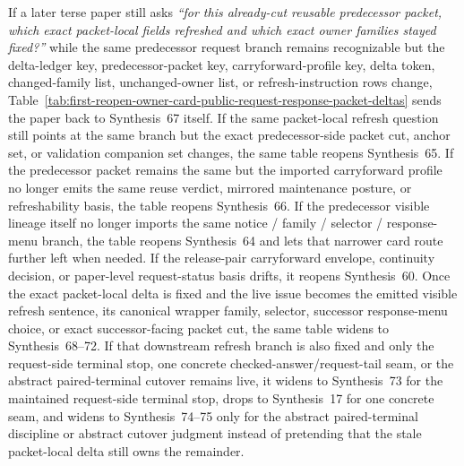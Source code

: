 \documentclass[11pt]{article}
\begin{document}
If a later terse paper still asks \emph{``for this already-cut reusable predecessor packet, which exact packet-local fields refreshed and which exact owner families stayed fixed?''} while the same predecessor request branch remains recognizable but the delta-ledger key, predecessor-packet key, carryforward-profile key, delta token, changed-family list, unchanged-owner list, or refresh-instruction rows change, Table~\ref{tab:first-reopen-owner-card-public-request-response-packet-deltas} sends the paper back to Synthesis~67 itself. If the same packet-local refresh question still points at the same branch but the exact predecessor-side packet cut, anchor set, or validation companion set changes, the same table reopens Synthesis~65. If the predecessor packet remains the same but the imported carryforward profile no longer emits the same reuse verdict, mirrored maintenance posture, or refreshability basis, the table reopens Synthesis~66. If the predecessor visible lineage itself no longer imports the same notice / family / selector / response-menu branch, the table reopens Synthesis~64 and lets that narrower card route further left when needed. If the release-pair carryforward envelope, continuity decision, or paper-level request-status basis drifts, it reopens Synthesis~60. Once the exact packet-local delta is fixed and the live issue becomes the emitted visible refresh sentence, its canonical wrapper family, selector, successor response-menu choice, or exact successor-facing packet cut, the same table widens to Synthesis~68--72. If that downstream refresh branch is also fixed and only the request-side terminal stop, one concrete checked-answer/request-tail seam, or the abstract paired-terminal cutover remains live, it widens to Synthesis~73 for the maintained request-side terminal stop, drops to Synthesis~17 for one concrete seam, and widens to Synthesis~74--75 only for the abstract paired-terminal discipline or abstract cutover judgment instead of pretending that the stale packet-local delta still owns the remainder.\cite{series:publicrequestcarryforward,series:publicrequestresponsemenus,series:publicrequestresponsepackets,series:publicrequestresponsepacketcarryforward,series:publicrequestresponsepacketrefreshnotices,series:publicrequestresponsepacketrefreshnormalforms,series:publicrequestresponsepacketrefreshselections,series:publicrequestresponsepacketrefreshresponsemenus,series:publicrequestresponsepacketrefreshresponsepackets,series:publicrequestresponsepacketrefreshresponsepacketclosureverdicts,series:pairedterminalcitationdiscipline,series:pairedterminalcutoverrule}
\end{document}
